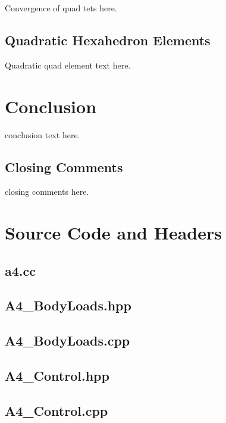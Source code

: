 \documentclass[a4paper, 12pt]{article}
\begin{document}
Convergence of quad tets here.

\subsection{Quadratic Hexahedron Elements} \label{subsec:quadHex}
Quadratic quad element text here.

\section{Conclusion} \label{sec:conclusion}
conclusion text here.

\subsection{Closing Comments} \label{sec:comments}
closing comments here.

\newpage
\appendix
\section{Source Code and Headers} \label{sec:code}

\newpage
\subsection{a4.cc} \label{subsec:a4.cc}


\newpage
\subsection{A4\_BodyLoads.hpp} \label{subsec:BLhpp}


\newpage
\subsection{A4\_BodyLoads.cpp} \label{subsec:BLcpp}


\newpage
\subsection{A4\_Control.hpp} \label{subsec:Cont.hpp}


\newpage
\subsection{A4\_Control.cpp} \label{subsec:Cont.cpp}

\end{document}
